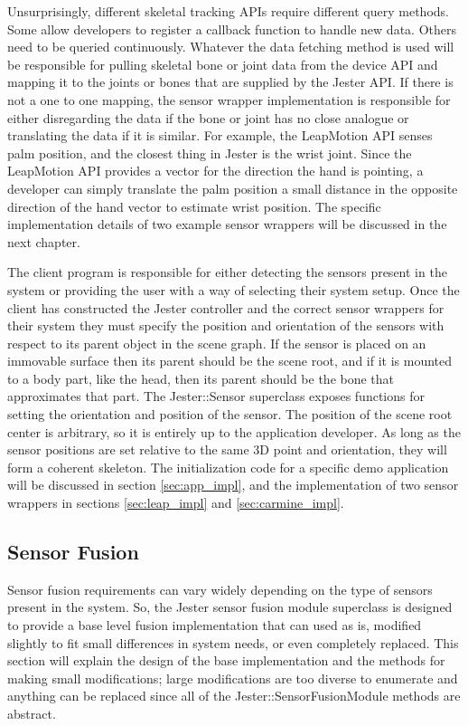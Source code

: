 Unsurprisingly, different skeletal tracking APIs require different query methods. Some allow developers to register a callback function to handle new data. Others need to be queried continuously. Whatever the data fetching method is used will be responsible for pulling skeletal bone or joint data from the device API and mapping it to the joints or bones that are supplied by the Jester API. If there is not a one to one mapping, the sensor wrapper implementation is responsible for either disregarding the data if the bone or joint has no close analogue or translating the data if it is similar. For example, the LeapMotion API senses palm position, and the closest thing in Jester is the wrist joint. Since the LeapMotion API provides a vector for the direction the hand is pointing, a developer can simply translate the palm position a small distance in the opposite direction of the hand vector to estimate wrist position. The specific implementation details of two example sensor wrappers will be discussed in the next chapter.

The client program is responsible for either detecting the sensors present in the system or providing the user with a way of selecting their system setup. Once the client has constructed the Jester controller and the correct sensor wrappers for their system they must specify the position and orientation of the sensors with respect to its parent object in the scene graph. If the sensor is placed on an immovable surface then its parent should be the scene root, and if it is mounted to a body part, like the head, then its parent should be the bone that approximates that part. The Jester::Sensor superclass exposes functions for setting the orientation and position of the sensor. The position of the scene root center is arbitrary, so it is entirely up to the application developer. As long as the sensor positions are set relative to the same 3D point and orientation, they will form a coherent skeleton. The initialization code for a specific demo application will be discussed in section \ref{sec:app_impl}, and the implementation of two sensor wrappers in sections \ref{sec:leap_impl} and \ref{sec:carmine_impl}.
	
\subsection{Sensor Fusion}\label{sec:fuser_des_impl}

Sensor fusion requirements can vary widely depending on the type of sensors present in the system. So, the Jester sensor fusion module superclass is designed to provide a base level fusion implementation that can used as is, modified slightly to fit small differences in system needs, or even completely replaced. This section will explain the design of the base implementation and the methods for making small modifications; large modifications are too diverse to enumerate and anything can be replaced since all of the Jester::SensorFusionModule methods are abstract.

